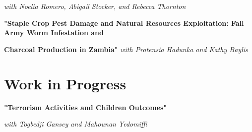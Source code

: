 \documentclass[letterpaper,11pt]{article}
\begin{document}
\hspace{0.5mm}
\textit{with Noelia Romero, Abigail Stocker, and Rebecca Thornton}
\vspace{0.5mm}
 

\vspace{3mm}
\hspace{-3mm}
\textbf{"Staple Crop Pest Damage and Natural Resources Exploitation: Fall Army Worm Infestation and}

\hspace{-2mm}
\textbf{Charcoal Production in Zambia"} 
\hspace{0.5mm}
\textit{with Protensia Hadunka and Kathy Baylis}

\section{Work in Progress}

\begin{adjustwidth}{3mm}{0mm}
\textbf{"Terrorism Activities and Children Outcomes"} 

\hspace{0.25mm}
\textit{with Togbedji Gansey and Mahounan Yedomiffi}
\end{adjustwidth}
\end{document}
